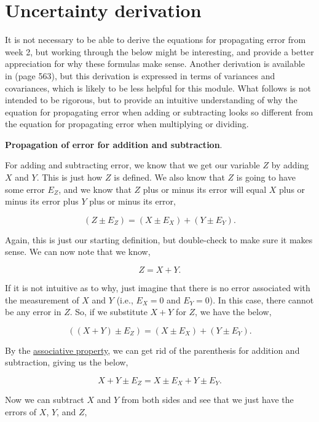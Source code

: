 \documentclass[
  openany]{scrbook}
\begin{document}
\hypertarget{uncertainty_derivation}{%
\chapter{Uncertainty derivation}\label{uncertainty_derivation}}

It is not necessary to be able to derive the equations for propagating error from week 2, but working through the below might be interesting, and provide a better appreciation for why these formulas make sense.
Another derivation is available in \citet{Box1978} (page 563), but this derivation is expressed in terms of variances and covariances, which is likely to be less helpful for this module.
What follows is not intended to be rigorous, but to provide an intuitive understanding of why the equation for propagating error when adding or subtracting looks so different from the equation for propagating error when multiplying or dividing.

\textbf{Propagation of error for addition and subtraction}.

For adding and subtracting error, we know that we get our variable \(Z\) by adding \(X\) and \(Y\). This is just how \(Z\) is defined. We also know that \(Z\) is going to have some error \(E_Z\), and we know that \(Z\) plus or minus its error will equal \(X\) plus or minus its error plus \(Y\) plus or minus its error,

\[(Z \pm E_Z) = (X  \pm E_X) + (Y \pm E_Y).\]

Again, this is just our starting definition, but double-check to make sure it makes sense. We can now note that we know,

\[Z =X+Y.\]

If it is not intuitive as to why, just imagine that there is no error associated with the measurement of \(X\) and \(Y\) (i.e., \(E_{X} = 0\) and \(E_{Y} = 0\)).
In this case, there cannot be any error in \(Z\). So, if we substitute \(X + Y\) for \(Z\), we have the below,

\[((X + Y) \pm E_Z) = (X  \pm E_X) + (Y \pm E_Y).\]

By the \href{https://en.wikipedia.org/wiki/Associative_property}{associative property}, we can get rid of the parenthesis for addition and subtraction, giving us the below,

\[X + Y \pm E_Z = X  \pm E_X + Y \pm E_Y.\]

Now we can subtract \(X\) and \(Y\) from both sides and see that we just have the errors of \(X\), \(Y\), and \(Z\),
\end{document}
